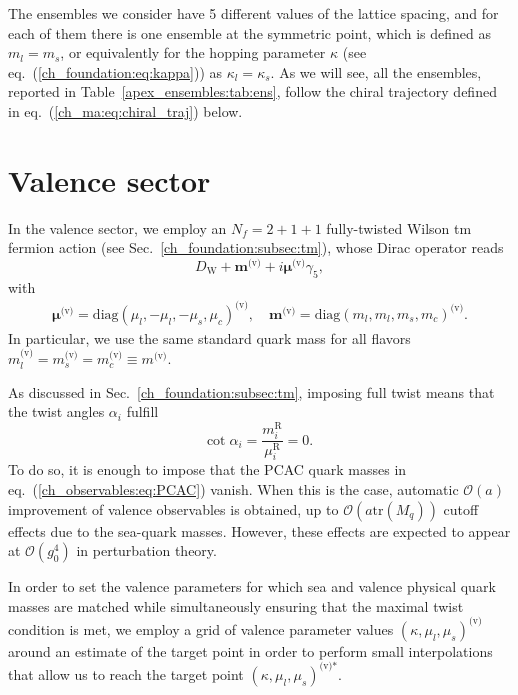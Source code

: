 The ensembles we consider have 5 different values of the lattice spacing, and for each of them there is one ensemble at the symmetric point, which is defined as $m_l=m_s$, or equivalently for the hopping parameter $\kappa$ (see eq.~(\ref{ch_foundation:eq:kappa})) as $\kappa_l=\kappa_s$. As we will see, all the ensembles, reported in Table~\ref{apex_ensembles:tab:ens}, follow the chiral trajectory defined in eq.~(\ref{ch_ma:eq:chiral_traj}) below.




\section{Valence sector}
\label{ch_ma:sec:Valence}

In the valence sector, we employ an $N_f=2+1+1$ fully-twisted Wilson tm fermion action (see Sec.~\ref{ch_foundation:subsec:tm}), whose Dirac operator reads
\begin{equation}
D_{\textrm{W}}+\boldsymbol{m}^{\textrm{(v)}}+i\boldsymbol{\mu}^{\textrm{(v)}}\gamma_5,
\end{equation}
with 
\begin{gather}
\boldsymbol{\mu}^{\textrm{(v)}}={\textrm{diag}}(\mu_l,-\mu_l,-\mu_s,\mu_c)^{\textrm{(v)}}, \quad
\boldsymbol{m}^{\textrm{(v)}}={\textrm{diag}}(m_l,m_l,m_s,m_c)^{\textrm{(v)}}.
\end{gather}
In particular, we use the same standard quark mass for all flavors $m_l^{\textrm{(v)}}=m_s^{\textrm{(v)}}=m_c^{\textrm{(v)}}\equiv m^{\textrm{(v)}}$.

As discussed in Sec.~\ref{ch_foundation:subsec:tm}, imposing full twist means that the twist angles $\alpha_i$ fulfill
\begin{equation}
{\textrm{cot}}\;\alpha_i=\frac{m_i^{\textrm{R}}}{\mu_i^{\textrm{R}}}=0.
\end{equation}
To do so, it is enough to impose that the PCAC quark masses in eq.~(\ref{ch_observables:eq:PCAC}) vanish. When this is the case, automatic $\mathcal{O}(a)$ improvement of valence observables is obtained, up to $\mathcal{O}(a\textrm{tr}\left(M_q\right))$ cutoff effects due to the sea-quark masses. However, these effects are expected to appear at $\mathcal{O}(g_0^4)$ in perturbation theory.

In order to set the valence parameters for which sea and valence physical quark masses are matched  while simultaneously ensuring that the maximal twist condition is met, we employ a grid of valence parameter values $\left(\kappa,\mu_l,\mu_s\right)^{\textrm{(v)}}$ around an estimate of the target point in order to perform small interpolations that allow us to reach the target point $\left(\kappa,\mu_l,\mu_s\right)^{\textrm{(v)*}}$.

